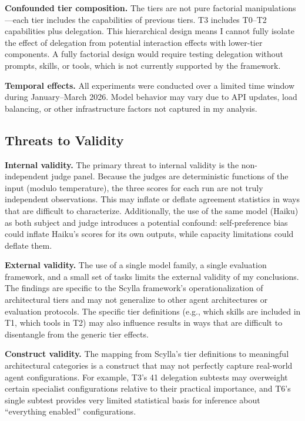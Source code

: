 \documentclass[11pt]{article}
\begin{document}
\textbf{Confounded tier composition.} The tiers are not pure factorial
manipulations---each tier includes the capabilities of previous tiers. T3
includes T0--T2 capabilities plus delegation. This hierarchical design means
I cannot fully isolate the effect of delegation from potential interaction
effects with lower-tier components. A fully factorial design would require
testing delegation without prompts, skills, or tools, which is not currently
supported by the framework.

\textbf{Temporal effects.} All experiments were conducted over a limited
time window during January--March 2026. Model behavior may vary due to API
updates, load balancing, or other infrastructure factors not captured in my
analysis.

\subsection{Threats to Validity}
\label{sec:threats}

\textbf{Internal validity.} The primary threat to internal validity is the
non-independent judge panel. Because the judges are deterministic functions
of the input (modulo temperature), the three scores for each run are not
truly independent observations. This may inflate or deflate agreement
statistics in ways that are difficult to characterize. Additionally, the
use of the same model (Haiku) as both subject and judge introduces a
potential confound: self-preference bias could inflate Haiku's scores for
its own outputs, while capacity limitations could deflate them.

\textbf{External validity.} The use of a single model family, a single
evaluation framework, and a small set of tasks limits the external validity
of my conclusions. The findings are specific to the Scylla framework's
operationalization of architectural tiers and may not generalize to other
agent architectures or evaluation protocols. The specific tier definitions
(e.g., which skills are included in T1, which tools in T2) may also
influence results in ways that are difficult to disentangle from the
generic tier effects.

\textbf{Construct validity.} The mapping from Scylla's tier definitions to
meaningful architectural categories is a construct that may not perfectly
capture real-world agent configurations. For example, T3's 41 delegation
subtests may overweight certain specialist configurations relative to their
practical importance, and T6's single subtest provides very limited
statistical basis for inference about ``everything enabled'' configurations.
\end{document}
